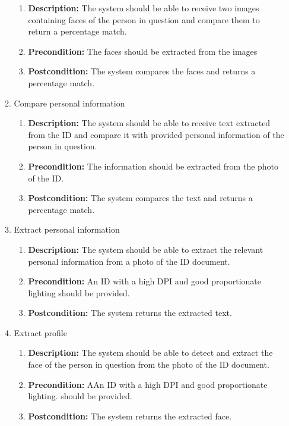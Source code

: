 \documentclass{article}
\begin{document}
\begin{enumerate}
\begin{enumerate}
\begin{enumerate}
					\item \textbf{Description:} The system should be able to receive two images containing faces of the person in question and compare them to return a percentage match.
					\item \textbf{Precondition:} The faces should be extracted from the images
					\item \textbf{Postcondition:} The system compares the faces and returns a percentage match.
				\end{enumerate}
				\item Compare personal information
				\begin{enumerate}
					\item \textbf{Description:} The system should be able to receive text extracted from the ID and compare it with provided personal information of the person in question.
					\item \textbf{Precondition:} The information should be extracted from the photo of the ID.
					\item \textbf{Postcondition:} The system compares the text and returns a percentage match.
				\end{enumerate}
				\item Extract personal information
				\begin{enumerate}
					\item \textbf{Description:} The system should be able to extract the relevant personal information from a photo of the ID document.
					\item \textbf{Precondition:} An ID with a high DPI and good proportionate lighting should be provided.
					\item \textbf{Postcondition:} The system returns the extracted text.
				\end{enumerate}
				\item Extract profile
				\begin{enumerate}
					\item \textbf{Description:} The system should be able to detect and extract the face of the person in question from the photo of the ID document.
					\item \textbf{Precondition:} AAn ID with a high DPI and good proportionate lighting. should be provided.
					\item \textbf{Postcondition:} The system returns the extracted face.
				\end{enumerate}
			\end{enumerate}
		\end{enumerate}
\end{document}
